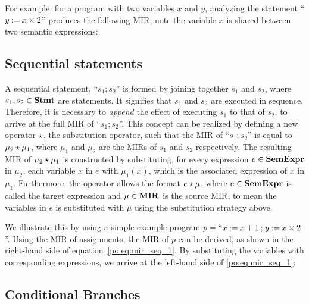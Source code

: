 For example, for a program with two variables $x$ and $y$, analyzing the
statement ``$y \mathbin{:=} x \times 2$'' produces the following MIR\@, note the
variable $x$ is shared between two semantic expressions:

\subsection{Sequential statements}
\label{po:sub:sequential_statements}

A sequential statement, ``$s_1 \semicolon s_2$'' is formed by joining together
$s_1$ and $s_2$, where $s_1, s_2 \in \mathbf{Stmt}$ are statements.  It signifies
that $s_1$ and $s_2$ are executed in sequence.  Therefore, it is necessary to
\emph{append} the effect of executing $s_1$ to that of $s_2$, to arrive at
the full MIR of ``$s_1 \semicolon s_2$''.  This concept can be realized by
defining a new operator $\mathbin{\star}$, the substitution operator, such that the MIR
of ``$s_1 \semicolon s_2$'' is equal to $\mu_2 \mathbin{\star} \mu_1$, where $\mu_1$
and $\mu_2$ are the MIRs of $s_1$ and $s_2$ respectively.  The resulting MIR
of $\mu_2 \mathbin{\star} \mu_1$ is constructed by substituting, for every expression
$e \in \mathbf{SemExpr}$ in $\mu_2$, each variable $x$ in $e$ with $\mu_1(x)$, which
is the associated expression of $x$ in $\mu_1$.  Furthermore, the operator
allows the format $e \mathbin{\star} \mu$, where $e \in \mathbf{SemExpr}$ is called the target
expression and $\mu \in \mathbf{MIR}$ is the source MIR, to mean the variables in
$e$ is substituted with $\mu$ using the substitution strategy above.

We illustrate this by using a simple example program $p = {}$``$x
\mathbin{:=} x + 1 \mathbin{;} y \mathbin{:=} x \times 2$''.  Using the MIR of
assignments, the MIR of $p$ can be derived, as shown in the right-hand
side of equation~\eqref{po:eq:mir_seq_1}.  By substituting the variables
with corresponding expressions, we arrive at the left-hand side of
\eqref{po:eq:mir_seq_1}:

\subsection{Conditional Branches}

